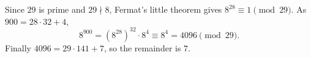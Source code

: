 Since $29$ is prime and $29\nmid 8$, Fermat's little theorem gives $8^{28}\equiv1\pmod{29}$. As $900=28\cdot32+4$,
\[
8^{900}=\left(8^{28}\right)^{32}\cdot8^4\equiv8^4=4096\pmod{29}.
\]
Finally $4096=29\cdot141+7$, so the remainder is $\boxed{7}$.
